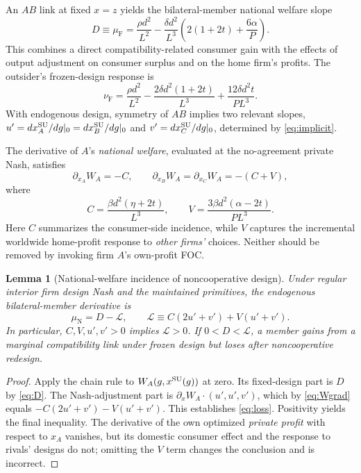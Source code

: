 \documentclass[11pt,a4paper]{article}
\newtheorem{lemma}[theorem]{Lemma}
\theoremstyle{remark}\newtheorem{remark}[theorem]{Remark}
\newcommand{\N}{\mathrm{N}}\newcommand{\F}{\mathrm{F}}
\newcommand{\loss}{\mathcal L}\newcommand{\vect}[1]{\boldsymbol{#1}}
\begin{document}
An $AB$ link at fixed $x=z$ yields the bilateral-member national welfare slope
\begin{equation}\label{eq:D}
D\equiv\mu_{\F}=
\frac{\rho d^2}{L^2}-\frac{\delta d^2}{L^3}
\left(2(1+2t)+\frac{6\alpha}{P}\right).
\end{equation}
This combines a direct compatibility-related consumer gain with the effects of output adjustment on consumer surplus and on the home firm's profits. The outsider's frozen-design response is
\begin{equation}\label{eq:nuF}
\nu_{\F}=\frac{\rho d^2}{L^2}-\frac{2\delta d^2(1+2t)}{L^3}
+\frac{12\delta d^2t}{PL^3}.
\end{equation}
With endogenous design, symmetry of $AB$ implies two relevant slopes, $u'=dx_A^{\mathrm{SU}}/dg|_0=dx_B^{\mathrm{SU}}/dg|_0$ and $v'=dx_C^{\mathrm{SU}}/dg|_0$, determined by \eqref{eq:implicit}.

The derivative of $A$'s \emph{national welfare}, evaluated at the no-agreement private Nash, satisfies
\begin{equation}\label{eq:Wgrad}
\partial_{x_A}W_A=-C,\qquad
\partial_{x_B}W_A=\partial_{x_C}W_A=-(C+V),
\end{equation}
where
\begin{equation}\label{eq:CV}
C=\frac{\beta d^2(\eta+2t)}{L^3},\qquad
V=\frac{3\beta d^2(\alpha-2t)}{PL^3}.
\end{equation}
Here $C$ summarizes the consumer-side incidence, while $V$ captures the incremental worldwide home-profit response to \emph{other firms'} choices. Neither should be removed by invoking firm $A$'s own-profit FOC.

\begin{lemma}[National-welfare incidence of noncooperative design]\label{lem:incidence}
Under regular interior firm design Nash and the maintained primitives, the endogenous bilateral-member derivative is
\begin{equation}\label{eq:loss}
\mu_{\N}=D-\loss,\qquad
\loss\equiv C(2u'+v')+V(u'+v').
\end{equation}
In particular, $C,V,u',v'>0$ implies $\loss>0$. If $0<D<\loss$, a member gains from a marginal compatibility link under frozen design but loses after noncooperative redesign.
\end{lemma}
\begin{proof}
Apply the chain rule to $W_A(g,x^{\mathrm{SU}}(g))$ at zero. Its fixed-design part is $D$ by \eqref{eq:D}. The Nash-adjustment part is $\partial_x W_A\cdot(u',u',v')$, which by \eqref{eq:Wgrad} equals $-C(2u'+v')-V(u'+v')$. This establishes \eqref{eq:loss}. Positivity yields the final inequality. The derivative of the own optimized \emph{private profit} with respect to $x_A$ vanishes, but its domestic consumer effect and the response to rivals' designs do not; omitting the $V$ term changes the conclusion and is incorrect.
\end{proof}
\end{document}
